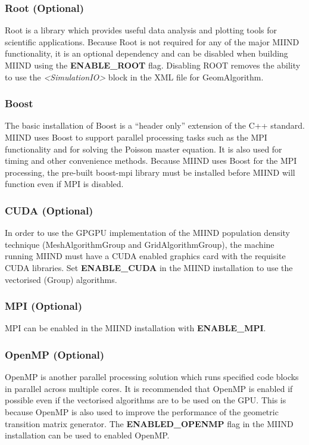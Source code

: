 \documentclass[utf8]{frontiers_suppmat} %
\begin{document}
\subsubsection*{Root (Optional)}
Root \citep{brun1997root} is a library which provides useful data analysis and plotting tools for scientific applications. Because Root is not required for any of the major MIIND functionality, it is an optional dependency and can be disabled when building MIIND using the \textbf{ENABLE\_ROOT} flag. Disabling ROOT removes the ability to use the \textit{\textless SimulationIO\textgreater} block in the XML file for GeomAlgorithm. 

\subsubsection*{Boost}
The basic installation of Boost is a ``header only'' extension of the C++ standard. MIIND uses Boost to support parallel processing tasks such as the MPI functionality and for solving the Poisson master equation. It is also used for timing and other convenience methods. Because MIIND uses Boost for the MPI processing, the pre-built boost-mpi library must be installed before MIIND will function even if MPI is disabled. 

\subsubsection*{CUDA (Optional)}
In order to use the GPGPU implementation of the MIIND population density technique (MeshAlgorithmGroup and GridAlgorithmGroup), the machine running MIIND must have a CUDA enabled graphics card with the requisite CUDA libraries. Set \textbf{ENABLE\_CUDA} in the MIIND installation to use the vectorised (Group) algorithms.

\subsubsection*{MPI (Optional)}
MPI can be enabled in the MIIND installation with \textbf{ENABLE\_MPI}. 

\subsubsection*{OpenMP (Optional)}
OpenMP is another parallel processing solution which runs specified code blocks in parallel across multiple cores. It is recommended that OpenMP is enabled if possible even if the vectorised algorithms are to be used on the GPU. This is because OpenMP is also used to improve the performance of the geometric transition matrix generator. The \textbf{ENABLED\_OPENMP} flag in the MIIND installation can be used to enabled OpenMP.
\end{document}
